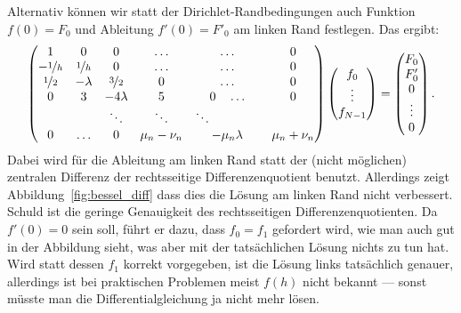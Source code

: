 Alternativ können wir statt der Dirichlet-Randbedingungen auch
Funktion $f(0) = F_0$ und Ableitung $f'(0)=F'_0$ am linken Rand
festlegen. Das ergibt:
\begin{equation}
  \begin{pmatrix}
    1 & 0         & 0         &\ldots & \ldots & 0\\
    -\nicefrac{1}{h} & \nicefrac{1}{h} & 0 & \ldots & \ldots & 0\\
    \nicefrac{1}{2} & -\lambda & \nicefrac{3}{2} & 0 & \ldots & 0\\
    0 & 3         & -4\lambda & 5 & 0\quad \ldots & 0\\
    & & \ddots & \ddots & \ddots\qquad\qquad \\
    0 & \ldots & 0 & \mu_n - \nu_n & -\mu_n\lambda & \mu_n + \nu_n\\
  \end{pmatrix}
  \begin{pmatrix}
    f_0\\
    \vdots\\
    f_{N-1}
  \end{pmatrix}=
  \begin{pmatrix}
    F_0\\
    F'_0\\
    0\\
    \vdots\\
    0 \\
  \end{pmatrix}.
\end{equation}
Dabei wird für die Ableitung am linken Rand statt der (nicht
möglichen) zentralen Differenz der rechtsseitige Differenzenquotient
benutzt.
Allerdings zeigt Abbildung~\ref{fig:bessel_diff} dass dies die Lösung
am linken Rand nicht verbessert. Schuld ist die geringe Genauigkeit
des rechtsseitigen Differenzenquotienten. Da $f'(0)=0$ sein soll,
führt er dazu, dass $f_0=f_1$ gefordert wird, wie man auch gut in der
Abbildung sieht, was aber mit der tatsächlichen Lösung nichts zu tun
hat. Wird statt dessen $f_1$ korrekt vorgegeben, ist die Lösung links
tatsächlich genauer, allerdings ist bei praktischen Problemen meist
$f(h)$ nicht bekannt --- sonst müsste man die Differentialgleichung ja
nicht mehr lösen.

